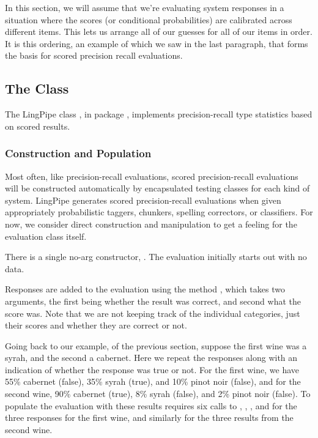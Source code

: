 In this section, we will assume that we're evaluating system responses
in a situation where the scores (or conditional probabilities) are
calibrated across different items.  This lets us arrange all of our
guesses for all of our items in order.  It is this ordering, an example
of which we saw in the last paragraph, that forms the basis for
scored precision recall evaluations.

\subsection{The  Class}

The LingPipe class , in package
, implements precision-recall type
statistics based on scored results.  

\subsubsection{Construction and Population}

Most often, like precision-recall evaluations, scored precision-recall
evaluations will be constructed automatically by encapsulated testing
classes for each kind of system.  LingPipe generates scored
precision-recall evaluations when given appropriately probabilistic
taggers, chunkers, spelling correctors, or classifiers.  For now, we
consider direct construction and manipulation to get a feeling for the
evaluation class itself.

There is a single no-arg constructor,
.  The evaluation initially
starts out with no data.

Responses are added to the evaluation using the method
, which takes two arguments, the first
being whether the result was correct, and second what the score was.
Note that we are not keeping track of the individual categories, just
their scores and whether they are correct or not.

Going back to our example, of the previous section, suppose the first
wine was a syrah, and the second a cabernet.  Here we repeat the
responses along with an indication of whether the response was true or
not.  For the first wine, we have 55\% cabernet (false), 35\% syrah
(true), and 10\% pinot noir (false), and for the second wine, 90\%
cabernet (true), 8\% syrah (false), and 2\% pinot noir (false).  To
populate the evaluation with these results requires six calls to
, ,
, and  for the three
responses for the first wine, and similarly for the three results from
the second wine.

